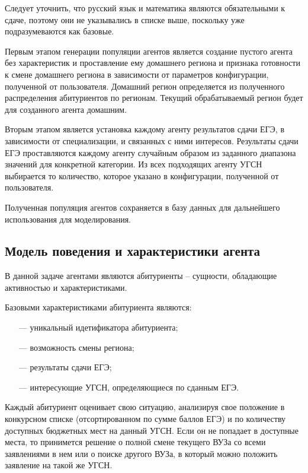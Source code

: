Следует уточнить, что русский язык и математика являются обязательными к сдаче, поэтому они не указывались в списке выше, поскольку уже подразумеваются как базовые.

Первым этапом генерации популяции агентов является создание пустого агента без характеристик и проставление ему домашнего региона и признака готовности к смене домашнего региона в зависимости от параметров конфигурации, полученной от пользователя. Домашний регион определяется из полученного распределения абитуриентов по регионам. Текущий обрабатываемый регион будет для созданного агента домашним.

Вторым этапом является установка каждому агенту результатов сдачи ЕГЭ, в зависимости от специализации, и связанных с ними интересов. Результаты сдачи ЕГЭ проставляются каждому агенту случайным образом из заданного диапазона значений для конкретной категории. Из всех подходящих агенту УГСН выбирается то количество, которое указано в конфигурации, полученной от пользователя.

Полученная популяция агентов сохраняется в базу данных для дальнейшего использования для моделирования.

\subsection{Модель поведения и характеристики агента}

В данной задаче агентами являются абитуриенты – сущности, обладающие активностью и характеристиками.

Базовыми характеристиками абитуриента являются:

\begin{itemize}[leftmargin=1.6\parindent]
	\item[---] уникальный идетификатора абитуриента;
	\item[---] возможность смены региона;
	\item[---] результаты сдачи ЕГЭ;
	\item[---] интересующие УГСН, определяющиеся по сданным ЕГЭ.

\end{itemize}

Каждый абитуриент оценивает свою ситуацию, анализируя свое положение в конкурсном списке (отсортированном по сумме баллов ЕГЭ) и по количеству доступных бюджетных мест на данный УГСН. Если он не попадает в доступные места, то принимется решение о полной смене текущего ВУЗа со всеми заявлениями в нем или о поиске другого ВУЗа, в который можно положить заявление на такой же УГСН.

